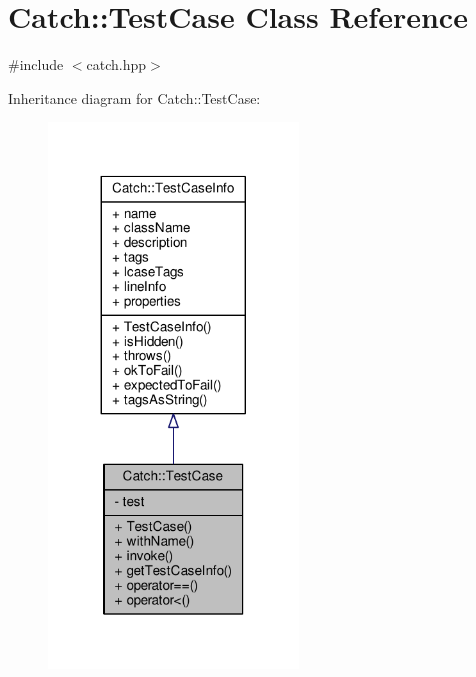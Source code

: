\hypertarget{class_catch_1_1_test_case}{\section{Catch\-:\-:Test\-Case Class Reference}
\label{class_catch_1_1_test_case}
}


{\ttfamily \#include $<$catch.\-hpp$>$}



Inheritance diagram for Catch\-:\-:Test\-Case\-:
\nopagebreak
\begin{figure}[H]
\begin{center}
\leavevmode
\includegraphics[width=188pt]{class_catch_1_1_test_case__inherit__graph}
\end{center}
\end{figure}


